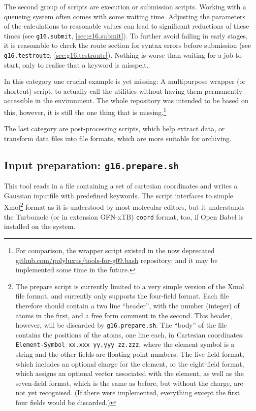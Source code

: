 \documentclass[   %
  final,          %
  a4paper         %
]{article}
\begin{document}
The second group of scripts are execution or submission scripts.
Working with a queueing system often comes with some waiting time.
Adjusting the parameters of the calculations to reasonable values
can lead to significant reductions of these times 
(see \lstinline`g16.submit`, \ref{sec:g16.submit}).
To further avoid failing in early stages, it is reasonable to check the route section
for syntax errors before submission (see \lstinline`g16.testroute`, \ref{sec:g16.testroute}).
Nothing is worse than waiting for a job to start, only to realise that a keyword is misspelt.

In this category one crucial example is yet missing:
A multipurpose wrapper (or shortcut) script, 
to actually call the utilities without having them permanently accessible 
in the environment.
The whole repository was intended to be based on this, 
however, it is still the one thing that is missing.\footnote{%
  For comparison, the wrapper script existed in the now deprecated
  \href{https://github.com/polyluxus/tools-for-g09.bash}{github.com/polyluxus/tools-for-g09.bash}
  repository; and it may be implemented some time in the future.}

The last category are post-processing scripts, 
which help extract data, or transform data files into file formats,
which are more suitable for archiving.

\subsection{Input preparation: \texorpdfstring{{\lstinline`g16.prepare.sh`}}{g16.prepare.sh}}
\label{sec:g16.prepare}

This tool reads in a file containing a set of cartesian coordinates and
writes a Gaussian inputfile with predefined keywords. 
The script interfaces to simple Xmol\footnote{%
  The prepare script is currently limited to a very simple version of the Xmol file format,
  and currently only supports the four-field format.
  Each file therefore should contain a two line ``header'', 
  with the number (integer) of atoms in the first, 
  and a free form comment in the second.
  This header, however, will be discarded by {\lstinline`g16.prepare.sh`}.
  The ``body'' of the file contains the positions of the atoms, one line each,
  in Cartesian coordinates: \texttt{Element-Symbol xx.xxx yy.yyy zz.zzz},
  where the element symbol is a string and the other fields are floating point numbers.
  The five-field format, which includes an optional charge for the element,
  or the eight-field format, which assigns an optional vector associated with the element,
  as well as the seven-field format, which is the same as before, but without the charge,
  are not yet recognised.
  (If there were implemented, everything except the first four fields would be discarded.)
}
format as it is understood by most molecular editors, 
but it understands the Turbomole (or in extension GFN-xTB) \texttt{coord} format, too,
if Open Babel is installed on the system.
\end{document}
